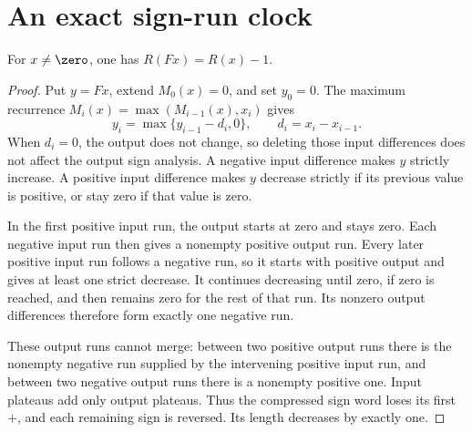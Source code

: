 \section{An exact sign-run clock}\label{sec:clock}

\begin{lemma}\label{lem:run}
For $x\ne\zero$, one has $R(Fx)=R(x)-1$.
\end{lemma}
\begin{proof}
Put $y=Fx$, extend $M_0(x)=0$, and set $y_0=0$. The maximum recurrence
$M_i(x)=\max(M_{i-1}(x),x_i)$ gives
\begin{equation}\label{eq:reflection}
 y_i=\max\{y_{i-1}-d_i,0\},\qquad d_i=x_i-x_{i-1}.
\end{equation}
When $d_i=0$, the output does not change, so deleting those input
differences does not affect the output sign analysis. A negative input
difference makes $y$ strictly increase. A positive input difference makes
$y$ decrease strictly if its previous value is positive, or stay zero if
that value is zero.

In the first positive input run, the output starts at zero and stays
zero. Each negative input run then gives a nonempty positive output run.
Every later positive input run follows a negative run, so it starts with
positive output and gives at least one strict decrease. It continues
decreasing until zero, if zero is reached, and then remains zero for the
rest of that run. Its nonzero output differences therefore form exactly
one negative run.

These output runs cannot merge: between two positive output runs there
is the nonempty negative run supplied by the intervening positive input
run, and between two negative output runs there is a nonempty positive
one. Input plateaus add only output plateaus. Thus the compressed sign
word loses its first $+$, and each remaining sign is reversed. Its length
decreases by exactly one.
\end{proof}


